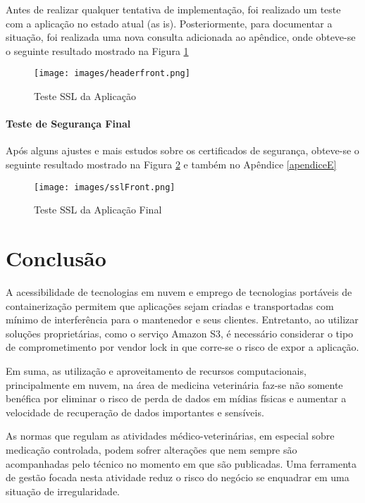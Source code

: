 \documentclass[
    12pt,               %
    openright,          %
    oneside,
    a4paper,            %
    BIBLATEX,           %
    TODO,               %
    english,            %
    brazil              %
    ]{ifsp-spo-inf-ctds}
\begin{document}
    Antes de realizar qualquer tentativa de implementação, foi realizado um teste com a aplicação no estado atual (as is). Posteriormente, para documentar a situação, foi realizada uma nova consulta adicionada ao apêndice, onde obteve-se o seguinte resultado mostrado na Figura \ref{fig:sslFront}

    \begin{figure}[H]
        \centering
        \texttt{[image: images/headerfront.png]}
        \caption{Teste SSL da Aplicação}
        \label{fig:sslFront}
    \end{figure}    

    \subsubsection{Teste de Segurança Final}

    Após alguns ajustes e mais estudos sobre os certificados de segurança, obteve-se o seguinte resultado mostrado na Figura \ref{fig:sslFrontfinal} e também no Apêndice \ref{apendiceE}

    \begin{figure}[H]
        \centering
        \texttt{[image: images/sslFront.png]}
        \caption{Teste SSL da Aplicação Final}
        \label{fig:sslFrontfinal}
    \end{figure}
    

\chapter[Conclusão]{Conclusão}

    A acessibilidade de tecnologias em nuvem e emprego de tecnologias portáveis de containerização permitem que aplicações sejam criadas e transportadas com mínimo de interferência para o mantenedor e seus clientes. Entretanto, ao utilizar soluções proprietárias, como o serviço Amazon S3, é necessário considerar o tipo de comprometimento por vendor lock in que corre-se o risco de expor a aplicação.

    Em suma, as utilização e aproveitamento de recursos computacionais, principalmente em nuvem, na área de medicina veterinária faz-se não somente benéfica por eliminar o risco de perda de dados em mídias físicas e aumentar a velocidade de recuperação de dados importantes e sensíveis.

    As normas que regulam as atividades médico-veterinárias, em especial sobre medicação controlada, podem sofrer alterações que nem sempre são acompanhadas pelo técnico no momento em que são publicadas. Uma ferramenta de gestão focada nesta atividade reduz o risco do negócio se enquadrar em uma situação de irregularidade.
\end{document}
